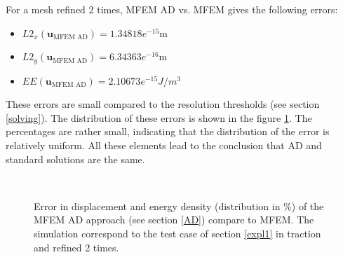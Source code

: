 \documentclass[12pt]{article}
\newcommand{\vm}[1]{
	{\ensuremath{\mathbf{#1}}}
}
\begin{document}
For a mesh refined 2 times, MFEM AD vs. MFEM gives the following errors:
\begin{itemize}
	\item $L2_x(\vm{u}_{\text{MFEM AD}})=1.34818e^{-15}$m
	\item $L2_y(\vm{u}_{\text{MFEM AD}})=6.34363e^{-16}$m
	\item $EE(\vm{u}_{\text{MFEM AD}})=2.10673e^{-15}J/m^3$
\end{itemize}
These errors are small compared to the resolution thresholds (see section \ref{solving}). The distribution of these errors is shown in the figure \ref{error_ad_u_ref2}. The percentages are rather small, indicating that the distribution of the error is relatively uniform. All these elements lead to the conclusion that AD and standard solutions are the same.
\begin{figure}	
	\centering
	\\
	\caption{Error in displacement and energy density (distribution in \%) of the MFEM AD approach (see section \ref{AD}) compare to MFEM. The simulation correspond to the test case of section \ref{expl1} in traction and refined 2 times.\label{error_ad_u_ref2}}
\end{figure}
\end{document}
